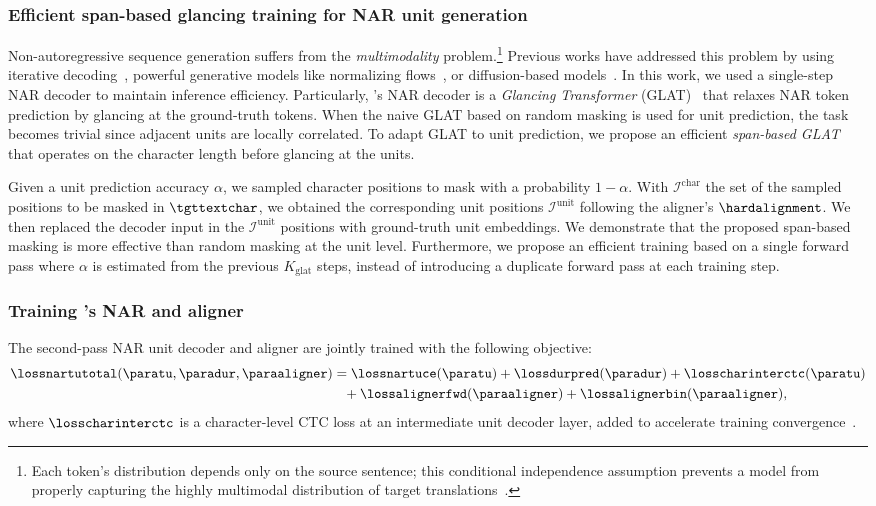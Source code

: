 \subsubsection{Efficient span-based glancing training for NAR unit generation}\label{sec:offline:glat}
Non-autoregressive sequence generation suffers from the \textit{multimodality} problem.\footnote{Each token’s distribution depends only on the source sentence; this conditional independence assumption prevents a model from properly capturing the highly multimodal distribution of target translations~\citep{gu2017non}.}
Previous works have addressed this problem by using iterative decoding~\citep{lee-etal-2018-deterministic},
powerful generative models like normalizing flows~\citep{ma-etal-2019-flowseq}, 
or diffusion-based models~\citep{gong2022diffuseq,reid2022diffuser}.
In this work, we used a single-step NAR decoder to maintain inference efficiency.
Particularly, \unitytwo's NAR \tu decoder is a \textit{Glancing Transformer} (GLAT)~\citep{qian-etal-2021-glancing} that relaxes NAR token prediction by glancing at the ground-truth tokens.
When the naive GLAT based on random masking is used for unit prediction, the task becomes trivial since adjacent units are locally correlated.
To adapt GLAT to unit prediction, we propose an efficient \textit{span-based GLAT} that operates on the character length before glancing at the units.

Given a unit prediction accuracy $\alpha$, we sampled character positions to mask with a probability $1-\alpha$.
With $\mathcal I^{\text{char}}$ the set of the sampled positions to be masked in $\tgttextchar$,
we obtained the corresponding unit positions $\mathcal I^{\text{unit}}$ following the aligner's $\hardalignment$.
We then replaced the decoder input in the $\mathcal I^{\text{unit}}$ positions with ground-truth unit embeddings.
We demonstrate that the proposed span-based masking is more effective than random masking at the unit level.
Furthermore, we propose an efficient training based on a single forward pass where $\alpha$ is estimated from the previous $K_{\text{glat}}$ steps, instead of introducing a duplicate forward pass at each training step.

\subsubsection{Training \unitytwo's NAR \tu and aligner}
\label{sec:offline:unity2_training}

The second-pass NAR unit decoder and aligner are jointly trained with the following objective:
\begin{align}\label{eq:tu_total_loss}
\begin{split}
\lossnartutotal(\paratu, \paradur, \paraaligner)
&= 
\lossnartuce(\paratu) + 
\lossdurpred(\paradur) +
\losscharinterctc(\paratu) 
\\ &\phantom{=}+
\lossalignerfwd(\paraaligner) + 
\lossalignerbin(\paraaligner), 
\end{split}
\end{align}
where $\losscharinterctc$ is a character-level CTC loss at an intermediate unit decoder layer, added to accelerate training convergence~\citep{lee2021intermediate}.

